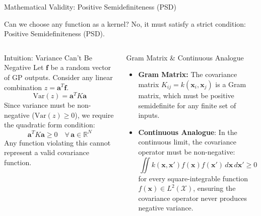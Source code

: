\documentclass[aspectratio=169, 10pt]{beamer}
\newcommand{\bx}{\mathbf{x}}
\begin{document}
\begin{frame}{Mathematical Validity: Positive Semidefiniteness (PSD)}
  
  Can we choose any function as a kernel? No, it must satisfy a strict condition: Positive Semidefiniteness (PSD).
  
  \begin{columns}[t]
      \begin{block}{Intuition: Variance Can't Be Negative}
        \scriptsize
        Let $\mathbf{f}$ be a random vector of GP outputs. Consider any linear combination $z = \mathbf{a}^T \mathbf{f}$.
        \[
          \text{Var}(z) = \mathbf{a}^T K \mathbf{a}
        \]
        Since variance must be non-negative ($\text{Var}(z) \ge 0$), we require the quadratic form condition:
        \[
          \mathbf{a}^T K \mathbf{a} \ge 0 \quad \forall \, \mathbf{a} \in \mathbb{R}^N
        \]
        Any function violating this cannot represent a valid covariance function.
      \end{block}
      
      \begin{block}{Gram Matrix \& Continuous Analogue}
        \scriptsize
        \begin{itemize}
          \item \textbf{Gram Matrix:} The covariance matrix $K_{ij} = k(\bx_i, \bx_j)$ is a Gram matrix, which must be positive semidefinite for any finite set of inputs.
          \item \textbf{Continuous Analogue}: In the continuous limit, the covariance operator must be non-negative:
            \[
              \iint k(\bx, \bx') f(\bx) f(\bx') \, d\bx \, d\bx' \ge 0
            \]
            for every square-integrable function $f(\bx) \in L^2(\mathcal{X})$, ensuring the covariance operator never produces negative variance.
        \end{itemize}
      \end{block}
  \end{columns}
\end{frame}
\end{document}
